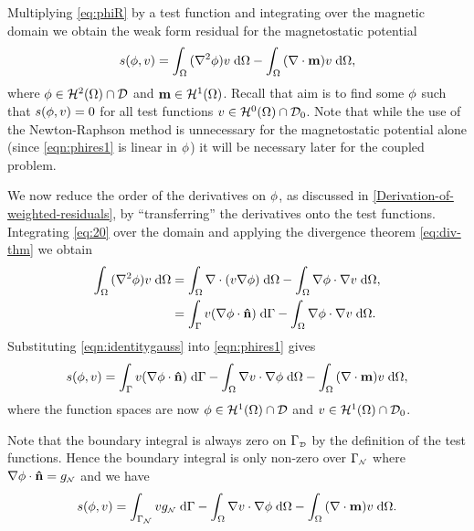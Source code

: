 Multiplying \cref{eq:phiR} by a test function and integrating over the magnetic domain we obtain the weak form residual for the magnetostatic potential
\begin{gather}
  s(\phi, v) = {\int_{\Omega} { (\nabla^2 \phi) v } {\; \mathrm{{d}}} {\Omega}}
  - {\int_{\Omega} { (\nabla \cdot \boldsymbol{\mathrm{m}}) v} {\; \mathrm{{d}}} {\Omega}}, \label{eqn:phires1}
\end{gather}
where $\phi \in \mathcal{H}^2(\Omega) \cap \mathcal{D}$ and $\boldsymbol{\mathrm{m}} \in \mathcal{H}^1(\Omega)$.
Recall that aim is to find some $\phi$ such that $s(\phi, v) = 0$ for all test functions $v \in \mathcal{H}^0(\Omega) \cap \mathcal{D}_0$.
Note that while the use of the Newton-Raphson method is unnecessary for the magnetostatic potential alone (since \cref{eqn:phires1} is linear in $\phi$) it will be necessary later for the coupled problem.

We now reduce the order of the derivatives on $\phi$, as discussed in \cref{Derivation-of-weighted-residuals}, by ``transferring'' the derivatives onto the test functions.
Integrating \cref{eq:20} over the domain and applying the divergence theorem \cref{eq:div-thm} we obtain
\begin{equation}
  \begin{aligned}
    {\int_{\Omega} { (\nabla^2\phi) v} {\; \mathrm{{d}}}{\Omega}} &=  {\int_{\Omega} {\nabla \cdot (v \nabla \phi)} {\; \mathrm{{d}}} {\Omega}}
           - {\int_{\Omega} {\nabla \phi \cdot \nabla v} {\; \mathrm{{d}}} {\Omega}},\\
    &= {\int_{{\Gamma}} {v (\nabla \phi \cdot \boldsymbol{\mathrm{\hat{n}}})} {\; \mathrm{{d}}} {{\Gamma}}}
    - {\int_{\Omega} { \nabla \phi \cdot \nabla v} {\; \mathrm{{d}}} {\Omega}}.
    \label{eqn:identitygauss}
  \end{aligned}
\end{equation}
Substituting \cref{eqn:identitygauss} into \cref{eqn:phires1} gives
\begin{equation}
  s(\phi, v) = {\int_{{\Gamma}} { v (\nabla \phi \cdot \boldsymbol{\mathrm{\hat{n}}}) } {\; \mathrm{{d}}} {{\Gamma}}}
  - {\int_{\Omega} { \nabla v \cdot \nabla \phi } {\; \mathrm{{d}}} {\Omega}}
  - {\int_{\Omega} { (\nabla \cdot \boldsymbol{\mathrm{m}}) v } {\; \mathrm{{d}}} {\Omega}},
\end{equation}
where the function spaces are now $\phi \in \mathcal{H}^1(\Omega) \cap \mathcal{D}$ and $v \in \mathcal{H}^1(\Omega) \cap \mathcal{D}_0$.

Note that the boundary integral is always zero on ${\Gamma}_{\scriptscriptstyle{\mathcal{D}}}$ by the definition of the test functions.
Hence the boundary integral is only non-zero over ${\Gamma}_{{\scriptscriptstyle{\mathcal{N}}}}$ where $\nabla \phi \cdot \boldsymbol{\mathrm{\hat{n}}} = g_{{\scriptscriptstyle{\mathcal{N}}}}$ and we have
\begin{equation}
  s(\phi, v) = \int_{{\Gamma}_{\scriptscriptstyle{\mathcal{N}}}} v g_{\scriptscriptstyle{\mathcal{N}}} {\; \mathrm{{d}}} {\Gamma}
  - {\int_{\Omega} { \nabla v \cdot \nabla \phi} {\; \mathrm{{d}}} {\Omega}}
  - {\int_{\Omega} { (\nabla \cdot \boldsymbol{\mathrm{m}}) v} {\; \mathrm{{d}}} {\Omega}}.
  \label{res:contphi}
\end{equation}


